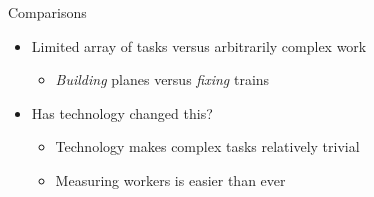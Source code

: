 \documentclass[presentation]{subfiles}
\begin{document}
\begin{frame}{Comparisons}
\begin{itemize}
  \item Limited array of tasks versus arbitrarily complex work
  \begin{itemize}
    \item \textit{Building} planes versus \textit{fixing} trains
  \end{itemize}
  \item \normalsize{Has technology changed this?}
    \begin{itemize}
      \item Technology makes complex tasks relatively trivial
      \item Measuring workers is easier than ever
    \end{itemize}
\end{itemize}
\end{frame}
\end{document}
